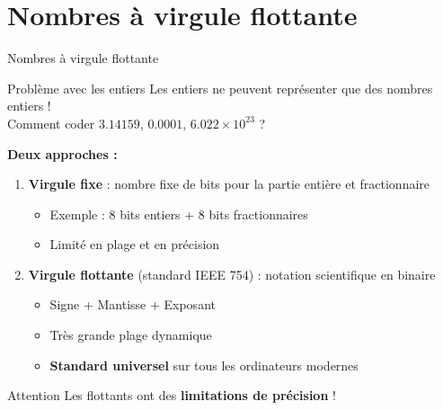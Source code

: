 \documentclass[aspectratio=1610]{beamer}
\begin{document}
\section{Nombres à virgule flottante}
%
\begin{frame}{Nombres à virgule flottante}

  \begin{block}{Problème avec les entiers}
    Les entiers ne peuvent représenter que des nombres entiers ! \\
    Comment coder $3.14159$, $0.0001$, $6.022 \times 10^{23}$ ?
  \end{block}

  \vspace{0.3cm}

  \textbf{Deux approches :}

  \begin{enumerate}
    \item \textbf{Virgule fixe} : nombre fixe de bits pour la partie entière et fractionnaire
    \begin{itemize}
      \item Exemple : 8 bits entiers + 8 bits fractionnaires
      \item Limité en plage et en précision
    \end{itemize}

    \pause

    \item \textbf{Virgule flottante} (standard IEEE 754) : notation scientifique en binaire
    \begin{itemize}
      \item Signe + Mantisse + Exposant
      \item Très grande plage dynamique
      \item \textbf{Standard universel} sur tous les ordinateurs modernes
    \end{itemize}
  \end{enumerate}


  \begin{alertblock}{Attention}
    Les flottants ont des \textbf{limitations de précision} !
  \end{alertblock}

\end{frame}
\end{document}
